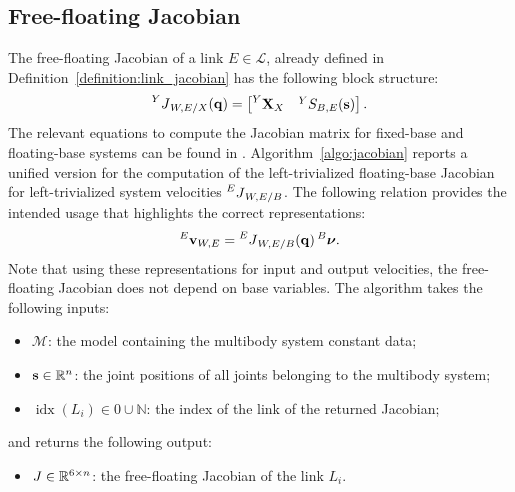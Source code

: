 \subsection{Free-floating Jacobian}

The free-floating Jacobian of a link $E \in \mathcal{L}$, already defined in Definition~\ref{definition:link_jacobian} has the following block structure:
%
\begin{equation*}
    \jac[Y]_{W,E/X}(\Qu) =
        \begin{bmatrix}
            \transvel[Y]_X & {}^Y S_{B,E}(\Shape)
        \end{bmatrix}
        .
\end{equation*}
%
The relevant equations to compute the Jacobian matrix for fixed-base and floating-base systems can be found in \parencite[Section~4.1 and Section~9.5]{featherstone_rigid_2008}.
Algorithm~\ref{algo:jacobian} reports a unified version for the computation of the left-trivialized floating-base Jacobian for left-trivialized system velocities $\jac[E]_{W,E/B}$.
The following relation provides the intended usage that highlights the correct representations:
%
\begin{equation*}
    \velsix[E]_{W,E} = \jac[E]_{W,E/B}(\Qu) \Nu[B]
    .
\end{equation*}
%
Note that using these representations for input and output velocities, the free-floating Jacobian does not depend on base variables.
The algorithm takes the following inputs:
%
\begin{itemize}
    \item $\mathcal{M}$: the model containing the multibody system constant data;
    \item $\Shape \in \realn^n$: the joint positions of all joints belonging to the multibody system;
    \item $\operatorname{idx}(L_i) \in 0 \cup \mathbb{N}$: the index of the link of the returned Jacobian;
\end{itemize}
%
and returns the following output:
%
\begin{itemize}
    \item $\jac \in \realn^{6\times n}$: the free-floating Jacobian of the link $L_i$.
\end{itemize}

